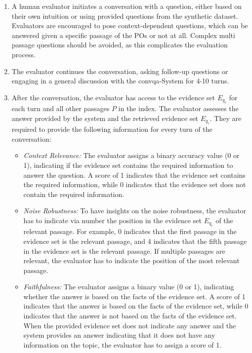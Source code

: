 \begin{enumerate}
    \item A human evaluator initiates a conversation with a question, either based on their own intuition or using provided questions from the synthetic dataset. Evaluators are encouraged to pose context-dependent questions, which can be answered given a specific passage of the POs or not at all. Complex multi passage questions should be avoided, as this complicates the evaluation process.
    \item The evaluator continues the conversation, asking follow-up questions or engaging in a general discussion with the \gls{convqa}-System for 4-10 turns.
    \item After the conversation, the evaluator has access to the evidence set $E_{q_c}$ for each turn and all other passages $P$ in the index. The evaluator assesses the answer provided by the system and the retrieved evidence set $E_{q_c}$. They are required to provide the following information for every turn of the conversation:
        \begin{itemize}
            \item \textit{Context Relevance:} The evaluator assigns a binary accuracy value (0 or 1), indicating if the evidence set contains the required information to answer the question. A score of 1 indicates that the evidence set contains the required information, while 0 indicates that the evidence set does not contain the required information.
            \item \textit{Noise Robustness:} To have insights on the noise robustness, the evaluator has to indicate via number the position in the evidence set $E_{q_c}$ of the relevant passage. For example, 0 indicates that the first passage in the evidence set is the relevant passage, and 4 indicates that the fifth passage in the evidence set is the relevant passage. If multiple passages are relevant, the evaluator has to indicate the position of the most relevant passage.
            \item \textit{Faithfulness:} The evaluator assigns a binary value (0 or 1), indicating whether the answer is based on the facts of the evidence set. A score of 1 indicates that the answer is based on the facts of the evidence set, while 0 indicates that the answer is not based on the facts of the evidence set. When the provided evidence set does not indicate any answer and the system provides an answer indicating that it does not have any information on the topic, the evaluator has to assign a score of 1.

\end{itemize}
\end{enumerate}
